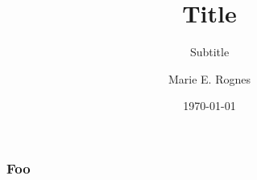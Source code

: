 \documentclass[mathserif]{beamer}
\begin{document}

\title{Title}
\subtitle{Subtitle}

\author[Rognes]{Marie E. Rognes}
\date{\today}





\simulatitlepage%

%

\begin{frame}
\frametitle{Foo}
\end{frame}
\end{document}
